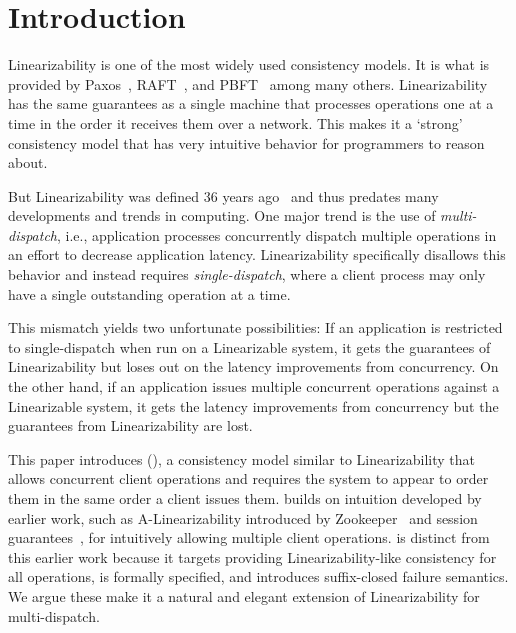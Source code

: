 \section{Introduction}
\label{sec:intro}




Linearizability is one of the most widely used consistency models.
It is what is provided by Paxos~\cite{lamport1998paxos}, RAFT~\cite{ongaro2014raft}, and PBFT~\cite{castro1999pbft} among many others.
Linearizability has the same guarantees as a single machine that processes operations one at a time in the order it receives them over a network.
This makes it a `strong' consistency model that has very intuitive behavior for programmers to reason about.

But Linearizability was defined 36 years ago~\cite{herlihy1990linearizability,herlihy1987linearizability} and thus predates many developments and trends in computing.
One major trend is the use of \textit{multi-dispatch}, i.e., application processes concurrently dispatch multiple operations in an effort to
decrease application latency.
Linearizability specifically disallows this behavior and instead requires \textit{single-dispatch}, where a client process may only have a single outstanding operation at a time.

This mismatch yields two unfortunate possibilities:
If an application is restricted to single-dispatch when run on a Linearizable system, it gets the guarantees of Linearizability but loses out on the latency improvements from concurrency.
On the other hand, if an application issues multiple concurrent operations against a Linearizable system, it gets the latency improvements from concurrency but the guarantees from Linearizability are lost.

This paper introduces \mdllong{} (\mdl{}), a consistency model similar to Linearizability that allows concurrent client operations and requires the system to appear to order them in the same order a client issues them.
\Mdl{} builds on intuition developed by earlier work, such as A-Linearizability introduced by Zookeeper~\cite{hunt2010zookeeper} and session guarantees~\cite{terry1994session}, for intuitively allowing multiple client operations.
\Mdl{} is distinct from this earlier work because it targets providing Linearizability-like consistency for all operations, is formally specified, and introduces suffix-closed failure semantics.
We argue these make it a natural and elegant extension of Linearizability for multi-dispatch.

